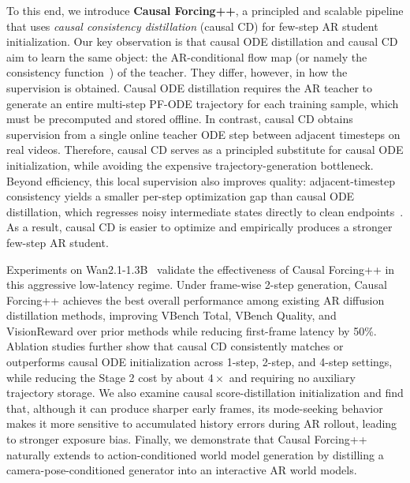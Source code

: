 To this end, we introduce \textbf{Causal Forcing++}, a principled and scalable pipeline that uses \emph{causal consistency distillation} (causal CD) for few-step AR student initialization. Our key observation is that causal ODE distillation and causal CD aim to learn the same object: the AR-conditional flow map (or namely the consistency function~\cite{song2023consistency,wang2024phased,lu2024simplifying,zheng2025large}) of the teacher. They differ, however, in how the supervision is obtained. Causal ODE distillation requires the AR teacher to generate an entire multi-step PF-ODE trajectory for each training sample, which must be precomputed and stored offline. In contrast, causal CD obtains supervision from a single online teacher ODE step between adjacent timesteps on real videos. Therefore, causal CD serves as a principled substitute for causal ODE initialization, while avoiding the expensive trajectory-generation bottleneck. Beyond efficiency, this local supervision also improves quality: adjacent-timestep consistency yields a smaller per-step optimization gap than causal ODE distillation, which regresses noisy intermediate states directly to clean endpoints~\cite{liu2023instaflow}. As a result, causal CD is easier to optimize and empirically produces a stronger few-step AR student.

Experiments on Wan2.1-1.3B~\cite{wan2025wan} validate the effectiveness of Causal Forcing++ in this aggressive low-latency regime. Under frame-wise 2-step generation, Causal Forcing++ achieves the best overall performance among existing AR diffusion distillation methods, improving VBench Total, VBench Quality, and VisionReward over prior methods while reducing first-frame latency by 50\%. Ablation studies further show that causal CD consistently matches or outperforms causal ODE initialization across 1-step, 2-step, and 4-step settings, while reducing the Stage 2 cost by about $4\times$ and requiring no auxiliary trajectory storage. We also examine causal score-distillation initialization and find that, although it can produce sharper early frames, its mode-seeking behavior makes it more sensitive to accumulated history errors during AR rollout, leading to stronger exposure bias. Finally, we demonstrate that Causal Forcing++ naturally extends to action-conditioned world model generation by distilling a camera-pose-conditioned generator into an interactive AR world models. 







